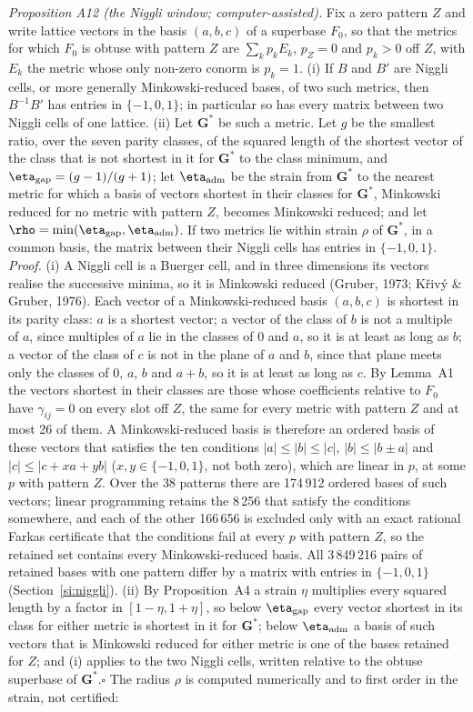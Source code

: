 \documentclass[preprint,pdf]{iucr}          %
\newcommand{\Gmet}{\mathbf{G}}
\begin{document}
\emph{Proposition A12 (the Niggli window; computer-assisted).} Fix a zero pattern $Z$ and write lattice vectors in the basis $(a,b,c)$ of a superbase $F_0$, so that the metrics for which $F_0$ is obtuse with pattern $Z$ are $\sum_kp_kE_k$, $p_Z=0$ and $p_k>0$ off $Z$, with $E_k$ the metric whose only non-zero conorm is $p_k=1$. (i) If $B$ and $B'$ are Niggli cells, or more generally Minkowski-reduced bases, of two such metrics, then $B^{-1}B'$ has entries in $\{-1,0,1\}$; in particular so has every matrix between two Niggli cells of one lattice. (ii) Let $\Gmet^*$ be such a metric. Let $g$ be the smallest ratio, over the seven parity classes, of the squared length of the shortest vector of the class that is not shortest in it for $\Gmet^*$ to the class minimum, and $\eta_{\rm gap}=(g-1)/(g+1)$; let $\eta_{\rm adm}$ be the strain from $\Gmet^*$ to the nearest metric for which a basis of vectors shortest in their classes for $\Gmet^*$, Minkowski reduced for no metric with pattern $Z$, becomes Minkowski reduced; and let $\rho=\min(\eta_{\rm gap},\eta_{\rm adm})$. If two metrics lie within strain $\rho$ of $\Gmet^*$, in a common basis, the matrix between their Niggli cells has entries in $\{-1,0,1\}$. \emph{Proof.} (i) A Niggli cell is a Buerger cell, and in three dimensions its vectors realise the successive minima, so it is Minkowski reduced (Gruber, 1973; K\v{r}iv\'y \& Gruber, 1976). Each vector of a Minkowski-reduced basis $(a,b,c)$ is shortest in its parity class: $a$ is a shortest vector; a vector of the class of $b$ is not a multiple of $a$, since multiples of $a$ lie in the classes of $0$ and $a$, so it is at least as long as $b$; a vector of the class of $c$ is not in the plane of $a$ and $b$, since that plane meets only the classes of $0$, $a$, $b$ and $a+b$, so it is at least as long as $c$. By Lemma~A1 the vectors shortest in their classes are those whose coefficients relative to $F_0$ have $\gamma_{ij}=0$ on every slot off $Z$, the same for every metric with pattern $Z$ and at most 26 of them. A Minkowski-reduced basis is therefore an ordered basis of these vectors that satisfies the ten conditions $|a|\le|b|\le|c|$, $|b|\le|b\pm a|$ and $|c|\le|c+xa+yb|$ ($x,y\in\{-1,0,1\}$, not both zero), which are linear in $p$, at some $p$ with pattern $Z$. Over the 38 patterns there are 174\,912 ordered bases of such vectors; linear programming retains the 8\,256 that satisfy the conditions somewhere, and each of the other 166\,656 is excluded only with an exact rational Farkas certificate that the conditions fail at every $p$ with pattern $Z$, so the retained set contains every Minkowski-reduced basis. All 3\,849\,216 pairs of retained bases with one pattern differ by a matrix with entries in $\{-1,0,1\}$ (Section~\ref{si:niggli}). (ii) By Proposition~A4 a strain $\eta$ multiplies every squared length by a factor in $[1-\eta,1+\eta]$, so below $\eta_{\rm gap}$ every vector shortest in its class for either metric is shortest in it for $\Gmet^*$; below $\eta_{\rm adm}$ a basis of such vectors that is Minkowski reduced for either metric is one of the bases retained for $Z$; and (i) applies to the two Niggli cells, written relative to the obtuse superbase of $\Gmet^*$.\hfill$\square$ The radius $\rho$ is computed numerically and to first order in the strain, not certified: 
\end{document}
